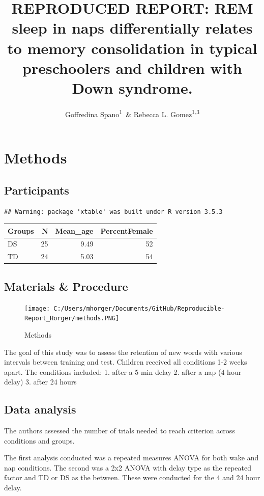 \documentclass[man]{apa6}
\title{REPRODUCED REPORT: REM sleep in naps differentially relates to memory
consolidation in typical preschoolers and children with Down syndrome.}
\author{Goffredina Spano\textsuperscript{1}~\& Rebecca L.
Gomez\textsuperscript{1,3}}
\date{}
\affiliation{
\vspace{0.5cm}
\textsuperscript{1} University of Arizona\\\textsuperscript{2} University College London}
\begin{document}
\maketitle

\section{Methods}\label{methods}

\subsection{Participants}\label{participants}

\begin{verbatim}
## Warning: package 'xtable' was built under R version 3.5.3
\end{verbatim}

\begin{tabular}{l|r|r|r}
\hline
Groups & N & Mean\_age & PercentFemale\\
\hline
DS & 25 & 9.49 & 52\\
\hline
TD & 24 & 5.03 & 54\\
\hline
\end{tabular}

\subsection{Materials \& Procedure}\label{materials-procedure}

\begin{figure}
\centering
\texttt{[image: C:/Users/mhorger/Documents/GitHub/Reproducible-Report\_Horger/methods.PNG]}
\caption{Methods}
\end{figure}

The goal of this study was to assess the retention of new words with
various intervals between training and test. Children received all
conditions 1-2 weeks apart. The conditions included: 1. after a 5 min
delay 2. after a nap (4 hour delay) 3. after 24 hours

\subsection{Data analysis}\label{data-analysis}

The authors assessed the number of trials needed to reach criterion
across conditions and groups.

The first analysis conducted was a repeated measures ANOVA for both wake
and nap conditions. The second was a 2x2 ANOVA with delay type as the
repeated factor and TD or DS as the between. These were conducted for
the 4 and 24 hour delay.
\end{document}
